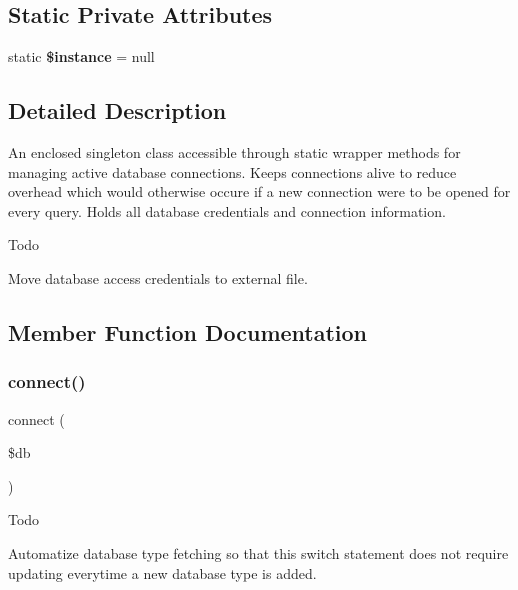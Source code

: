 \subsection*{Static Private Attributes}
\begin{DoxyCompactItemize}
\item 
\mbox{\label{class_d_b_connection_ad9d7ce33ebb142b70e58b68052ca0ea8}} 
static {\bfseries \$instance} = null
\end{DoxyCompactItemize}


\subsection{Detailed Description}
An enclosed singleton class accessible through static wrapper methods for managing active database connections. Keeps connections alive to reduce overhead which would otherwise occure if a new connection were to be opened for every query. Holds all database credentials and connection information. \begin{DoxyRefDesc}{Todo}
\item[\textbf{ Todo}]Move database access credentials to external file. \end{DoxyRefDesc}


\subsection{Member Function Documentation}
\mbox{\label{class_d_b_connection_a1191ef26fe6381a3bfbd33c0c6f7b9f4}} 
\subsubsection{connect()}
{\footnotesize\ttfamily connect (\begin{DoxyParamCaption}\item[{array \&}]{\$db }\end{DoxyParamCaption})\hspace{0.3cm}{\ttfamily [private]}}

\begin{DoxyRefDesc}{Todo}
\item[\textbf{ Todo}]Automatize database type fetching so that this switch statement does not require updating everytime a new database type is added. \end{DoxyRefDesc}

